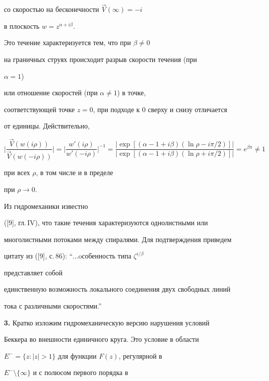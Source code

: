 со скоростью на бесконечности $\Vec V(\infty)=-i$ 


в плоскость $w=z^{\alpha+i\beta}$.


Это течение характеризуется тем, что при $\beta\ne 0$ 


на граничных струях происходит разрыв скорости течения (при 


$\alpha=1$) 


или отношение скоростей (при $\alpha\ne 1$) в точке, 


соответствующей точке $z=0$, при подходе к 0 сверху и снизу отличается 


от единицы. Действительно, 


$$ 


\bigg|\frac{\Vec V(w(i\rho))}{\Vec V(w(-i\rho))}\bigg|=\bigg| 


\frac{w'(i\rho)}{w'(-i\rho)}\bigg|^{-1}= 


\frac{|\exp[(\alpha-1+i\beta)(\ln\rho-i\pi/2)]|} 


{|\exp[(\alpha-1+i\beta)(\ln\rho+i\pi/2)]|}= 


e^{\beta\pi}\ne 1


$$ 


при всех $\rho$, в том числе и в пределе 


при $\rho \to 0$. 


 


Из гидромеханики известно 


([9], гл.\,IV), что такие течения характеризуются однолистными или 


многолистными потоками между спиралями. Для подтверждения приведем 


цитату из ([9], с.\,86): ``$\dotsc$oсобенность типа $\zeta^{i/\beta}$ 


представляет собой 


единственную возможность локального соединения двух свободных линий 


тока с различными скоростями.'' 


\medskip 


 


{\bf 3.} Кратко изложим гидромеханическую версию нарушения условий 


Беккера во внешности единичного круга. Это условие в области 


$E^-=\{z:|z|>1\}$ для функции $F(z)$, регулярной в 


$E^-\setminus\{\infty\}$ и с полюсом первого порядка в 



